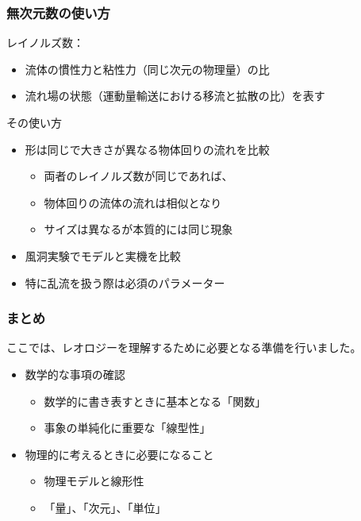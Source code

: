 \documentclass[unicode,12pt,aspectratio=169]{beamer}
\begin{document}
\begin{frame}
	\frametitle{無次元数の使い方}
	\begin{block}{レイノルズ数：}
		\begin{itemize}
			\item 流体の慣性力と粘性力（同じ次元の物理量）の比
			\item 流れ場の状態（運動量輸送における移流と拡散の比）を表す
		\end{itemize}
	\end{block}
	\begin{block}{その使い方}
		\begin{itemize}
			\item 形は同じで大きさが異なる物体回りの流れを比較
			\begin{itemize}
				\item 両者のレイノルズ数が同じであれば、
				\item 物体回りの流体の流れは相似となり
				\item サイズは異なるが本質的には同じ現象
			\end{itemize}
			\item 風洞実験でモデルと実機を比較
			\item  特に乱流を扱う際は必須のパラメーター
		\end{itemize}
	\end{block}
\end{frame}

\begin{frame}
	\frametitle{まとめ}
	ここでは、レオロジーを理解するために必要となる準備を行いました。
	\begin{boxnote}
		\begin{itemize}
			\item 数学的な事項の確認
			\begin{itemize}
				\item 数学的に書き表すときに基本となる「関数」
				\item 事象の単純化に重要な「線型性」
			\end{itemize}
			\item 物理的に考えるときに必要になること
			\begin{itemize}
				\item 物理モデルと線形性
				\item 「量」、「次元」、「単位」
			\end{itemize}
		\end{itemize} 
	\end{boxnote}
\end{frame}
\end{document}
